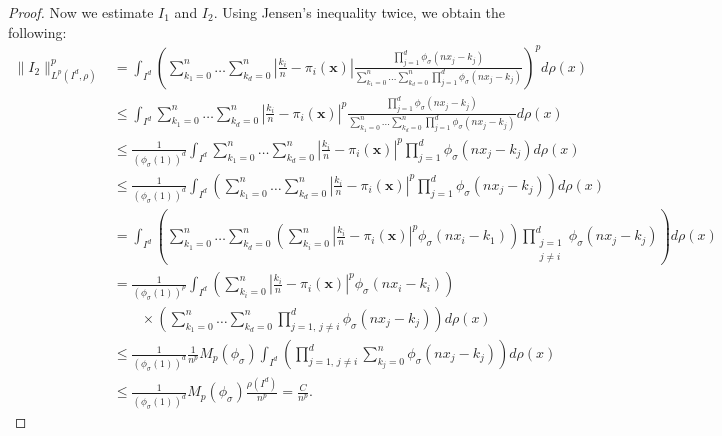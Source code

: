 \documentclass[10pt,a4paper]{amsart}
\newcommand{\LP}{L^p(I^d, \rho)}
\newcommand{\X}{\mathbf{x}}
\begin{document}
\begin{proof}
Now we estimate $I_1$ and $I_2.$ Using Jensen's inequality twice, we obtain the following:
\begin{align}
\|I_2\|^p_{\LP} 
&= \int_{I^d} \left( \sum_{k_1=0}^n \ldots \sum_{k_d=0}^n \left| \frac{k_i}{n} - \pi_i(\X) \right| \frac{\prod_{j=1}^d \phi_\sigma(nx_j - k_j)} {\sum_{k_1=0}^n \ldots \sum_{k_d=0}^n \prod_{j=1}^d \phi_\sigma(nx_j - k_j)} \right)^p d\rho(x) \nonumber \\
&\leq \int_{I^d} \sum_{k_1=0}^n \ldots \sum_{k_d=0}^n \left| \frac{k_i}{n} - \pi_i(\X) \right|^p \frac{\prod_{j=1}^d \phi_\sigma(nx_j - k_j)} {\sum_{k_1=0}^n \ldots \sum_{k_d=0}^n \prod_{j=1}^d \phi_\sigma(nx_j - k_j)} d\rho(x) \nonumber \\
&\leq \frac{1}{(\phi_\sigma(1))^d} \int_{I^d} \sum_{k_1=0}^n \ldots \sum_{k_d=0}^n \left| \frac{k_i}{n} - \pi_i(\X) \right|^p \prod_{j=1}^d \phi_\sigma(nx_j - k_j) d\rho(x) \nonumber \\
&\leq \frac{1}{(\phi_\sigma(1))^d} \int_{I^d} \left( \sum_{k_1=0}^n \ldots \sum_{k_d=0}^n \left| \frac{k_i}{n} - \pi_i(\X) \right|^p \prod_{j=1}^d \phi_\sigma(nx_j - k_j) \right) d\rho(x) \nonumber \\
&=  \int_{I^d} \left( \sum_{k_1=0}^n \ldots \sum_{k_d=0}^n \left( \sum_{k_i=0}^n \left| \frac{k_i}{n} - \pi_i(\X) \right|^p \phi_\sigma(nx_i - k_1) \right) \prod_{\substack{j=1 \\ j\neq i}}^d \phi_\sigma(nx_j - k_j)\right) d\rho(x) \nonumber \\
&= \frac{1}{(\phi_\sigma(1))^p} \int_{I^d} \left( \sum_{k_i=0}^n \left| \frac{k_i}{n} - \pi_i(\X) \right|^p \phi_\sigma(nx_i - k_i) \right) \nonumber \\
&\qquad \times \left( \sum_{k_1=0}^n \ldots \sum_{k_d=0}^n \prod_{j=1,\, j \neq i}^d \phi_\sigma(nx_j - k_j) \right) d\rho(x) \nonumber \\
&\leq \frac{1}{(\phi_\sigma(1))^d} \frac{1}{n^p} M_p(\phi_\sigma) \int_{I^d} \left( \prod_{j=1,\, j \neq i}^d \sum_{k_j=0}^n \phi_\sigma(nx_j - k_j) \right) d\rho(x) \nonumber \\
&\leq \frac{1}{(\phi_\sigma(1))^d} M_p(\phi_\sigma) \frac{\rho(I^d)}{n^p} = \frac{C}{n^p}. \label{mI2esti}
\end{align}


\end{proof}
\end{document}
